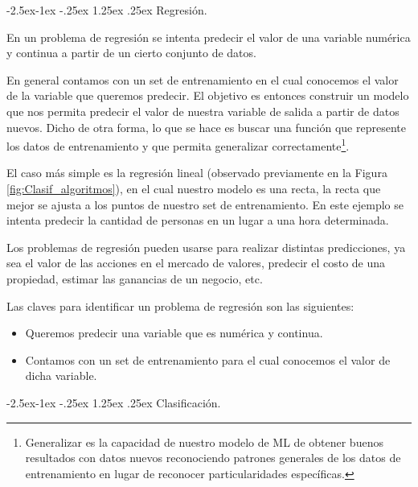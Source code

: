 \documentclass[12pt,a4paper]{article}
\makeatletter
\renewcommand\paragraph{\@startsection{paragraph}{4}{\z@}
            {-2.5ex\@plus -1ex \@minus -.25ex}
            {1.25ex \@plus .25ex}
            {\normalfont\normalsize\bfseries}}
\makeatother
\begin{document}
\begin{sloppypar}

\paragraph{Regresión.}

En un problema de regresión se intenta predecir el valor de una variable numérica y continua a partir de un cierto conjunto de datos. 

En general contamos con un set de entrenamiento en el cual conocemos el valor de la variable que queremos predecir. El objetivo es entonces construir un modelo que nos permita predecir el valor de nuestra variable de salida a partir de datos nuevos. Dicho de otra forma, lo que se hace es buscar una función que represente los datos de entrenamiento y que permita generalizar correctamente\footnote{Generalizar es la capacidad de nuestro modelo de ML de obtener buenos resultados con datos nuevos reconociendo patrones generales de los datos de entrenamiento en lugar de reconocer particularidades específicas.}.

El caso más simple es la regresión lineal (observado previamente en la Figura \ref{fig:Clasif_algoritmos}), en el cual nuestro modelo es una recta, la recta que mejor se ajusta a los puntos de nuestro set de entrenamiento. En este ejemplo se intenta predecir la cantidad de personas en un lugar a una hora determinada. 

Los problemas de regresión pueden usarse para realizar distintas predicciones, ya sea el valor de las acciones en el mercado de valores, predecir el costo de una propiedad, estimar las ganancias de un negocio, etc. 

Las claves para identificar un problema de regresión\cite{apunte_uba} son las siguientes:
\begin{itemize}
\item Queremos predecir una variable que es numérica y continua.
\item Contamos con un set de entrenamiento para el cual conocemos el valor de dicha variable.
\end{itemize}

\cleardoublepage
\paragraph{Clasificación.}\label{clasificacion}


\end{sloppypar}
\end{document}
